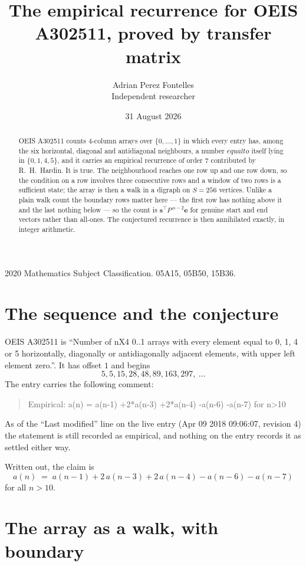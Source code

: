 \documentclass[11pt,a4paper]{article}
\title{The empirical recurrence for OEIS A302511, proved by transfer matrix}
\author{Adrian Perez Fontelles\\ \small Independent researcher}
\date{31 August 2026}
\theoremstyle{plain}
\theoremstyle{definition}
\begin{document}
\maketitle

\begin{abstract}
OEIS A302511 counts $4$-column arrays over $\{0,\dots,1\}$ in which every entry has,
among the six horizontal, diagonal and antidiagonal neighbours, a number $equal to$ itself lying in $\{0,1,4,5\}$, and it carries an empirical
recurrence of order $7$ contributed by R.~H.~Hardin. It is true. The neighbourhood
reaches one row up and one row down, so the condition on a row involves three consecutive
rows and a window of two rows is a sufficient state; the array is then a walk in a digraph
on $S=256$ vertices. Unlike a plain walk count the boundary rows matter here --- the first
row has nothing above it and the last nothing below --- so the count is
$\mathbf{s}^{\!\top}P^{\,n-2}\mathbf{e}$ for genuine start and end vectors rather than
all-ones. The conjectured recurrence is then annihilated exactly, in integer arithmetic.
\end{abstract}

\noindent\small 2020 Mathematics Subject Classification. 05A15, 05B50, 15B36.\normalsize

\section{The sequence and the conjecture}

OEIS A302511 is ``Number of nX4 0..1 arrays with every element equal to 0, 1, 4 or 5 horizontally, diagonally or antidiagonally adjacent elements, with upper left element zero.''. It has offset
$1$ and begins
\[
5, 5, 15, 28, 48, 89, 163, 297,\ \dots
\]
The entry carries the following comment:
\begin{quote}\small
Empirical: a(n) = a(n-1) +2*a(n-3) +2*a(n-4) -a(n-6) -a(n-7) for n>10
\end{quote}
As of the ``Last modified'' line on the live entry (Apr 09 2018 09:06:07, revision
4) the statement is still recorded as empirical, and nothing on the entry
records it as settled either way.

Written out, the claim is
\begin{equation}\label{eq:conj}
a(n)\;=\;a(n-1) + 2\,a(n-3) + 2\,a(n-4) - a(n-6) - a(n-7)
\end{equation}
for all $n>10$.

\section{The array as a walk, with boundary}
\end{document}
